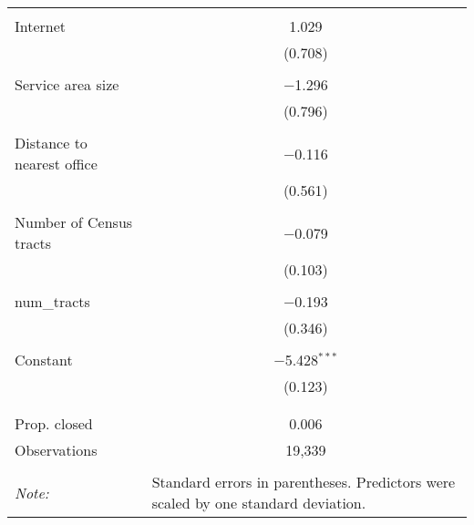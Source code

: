 \begin{table}[!htbp]
\begin{tabular}{@{\extracolsep{5pt}}lc}
  & \\ 
 Internet & 1.029 \\ 
  & (0.708) \\ 
  & \\ 
 Service area size & $-$1.296 \\ 
  & (0.796) \\ 
  & \\ 
 Distance to nearest office & $-$0.116 \\ 
  & (0.561) \\ 
  & \\ 
 Number of Census tracts & $-$0.079 \\ 
  & (0.103) \\ 
  & \\ 
 num\_tracts & $-$0.193 \\ 
  & (0.346) \\ 
  & \\ 
 Constant & $-$5.428$^{***}$ \\ 
  & (0.123) \\ 
  & \\ 
\hline \\[-1.8ex] 
Prop. closed & 0.006 \\ 
Observations & 19,339 \\ 
\hline 
\hline \\[-1.8ex] 
\textit{Note:}  & \multicolumn{1}{l}{Standard errors in parentheses. Predictors were scaled by one standard deviation.} \\ 
\end{tabular} 
\end{table} 
